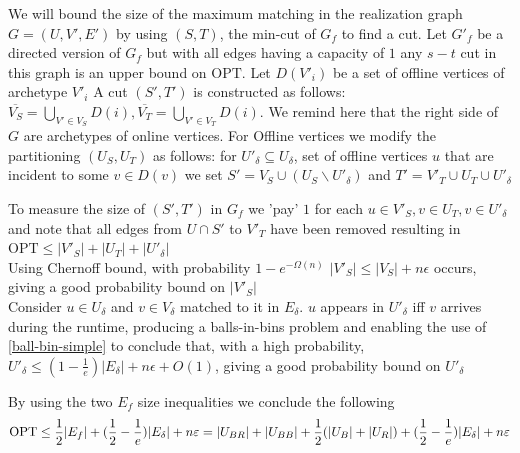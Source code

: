We will bound the size of the maximum matching in the realization graph $G=(U,V',E')$ by using $(S,T)$, the min-cut of $G_f$ to find a cut. Let $G'_f$ be a directed version of $G_f$ but with all edges having a capacity of $1$ any $s-t$ cut in this graph is an upper bound on $\mathrm{OPT}$. Let $D(V'_i)$ be a set of offline vertices of archetype $V'_i$  A cut $(S',T')$ is constructed as follows: $\overline{V_S}=\bigcup\limits_{V'\in V_S}D(i),\overline{V_T}=\bigcup\limits_{V'\in V_T}D(i)$. We remind here that the right side of $G$ are archetypes of online vertices. For Offline vertices we modify the partitioning $(U_S,U_T)$ as follows: for $U'_\delta\subseteq U_\delta$, set of offline vertices $u$ that are incident to some $v\in D(v)$ we set $S'=V_S\cup(U_S\backslash U'_\delta)$ and $T'=V'_T\cup U_T\cup U'_\delta$

To measure the size of $(S',T')$ in $G_f$ we 'pay' $1$ for each $u\in V'_S,v\in U_T, v\in U'_\delta$ and note that all edges from $U\cap S'$ to $V'_T$ have been removed resulting in $\mathrm{OPT}\leq|V'_S|+|U_T|+|U'_\delta|$\\
Using Chernoff bound, with probability $1-e^{-\Omega(n)}$ $|V'_S|\leq |V_S|+n \epsilon$ occurs, giving a good probability bound on $|V'_S|$\\
Consider $u\in U_\delta$ and $v\in V_\delta$ matched to it in $E_\delta$. $u$ appears in $U'_\delta$ iff $v$ arrives during the runtime, producing a balls-in-bins problem and enabling the use of \autoref{ball-bin-simple} to conclude that, with a high probability, $U'_\delta\leq(1-\frac{1}{e})|E_\delta|+n \epsilon+O(1)$, giving a good probability bound on $U'_\delta$

By using the two $E_f$ size inequalities we conclude the following
\begin{equation}
	\label{st-eq4}
	\mathrm{OPT}\leq \frac{1}{2}|E_f|+(\frac{1}{2}-\frac{1}{e})|E_\delta|+n \epsilon\\
	=|U_{BR}|+|U_{BB}|+\frac{1}{2}(|U_B|+|U_R|)+(\frac{1}{2}-\frac{1}{e})|E_\delta|+n \epsilon
\end{equation}
